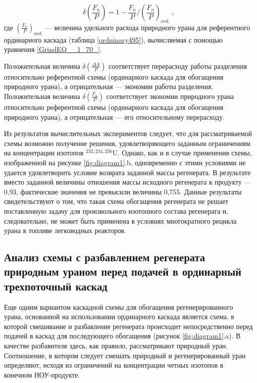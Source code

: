 \begin{equation} \label{DeltaFnu} 
  \delta(\frac{F_n}{P})=1-\frac{F_n}{P}/(\frac{F_n}{P})_{ord.} \; ,
\end{equation} 
где $(\frac{F_n}{P})_{ord.}$ --- величина удельного расхода природного урана для референтного ординарного каскада (таблица \ref{ordninary495}), вычисляемая с помощью уравнения \ref{GrindEQ__1_70_}.

Положительная величина $\delta(\frac{\Delta A}{P})$ соответствует перерасходу работы разделения относительно референтной схемы (ординарного каскада для обогащения природного урана), а отрицательная --- экономии работы разделения. Положительная величина $\delta(\frac{F_n}{P})$ соответствует экономии природного урана относительно референтной схемы (ординарного каскада для обогащения природного урана), а отрицательная --- его относительному перерасходу.


Из результатов вычислительных экспериментов следует, что для рассматриваемой схемы возможно получение решения, удовлетворяющего заданным ограничениям на концентрации изотопов $^{232,234,236}$U. Однако, как и в случае применения схемы, изображенной на рисунке \ref{fig:diagram1}.b, одновременно с этими условиями не удается удовлетворить условие возврата заданной массы регенерата. В результате вместо заданной величины отношения массы исходного регенерата к продукту --- 0,93, фактические значения не превысили величины 0,755. Данные результаты свидетельствуют о том, что такая схема обогащения регенерата не решает поставленную задачу для произвольного изотопного состава регенерата и, следовательно, не может быть применена в условиях многократного рецикла урана в топливе легководных реакторов.


\subsection{Анализ схемы с разбавлением регенерата природным ураном перед подачей в ординарный трехпоточный каскад}

Еще одним вариантом каскадной схемы для обогащения регенерированного урана, основанной на использовании ординарного каскада является схема, в которой смешивание и разбавление регенерата происходит непосредственно перед подачей в каскад для последующего обогащения (рисунок \ref{fig:diagram1}.a). В качестве разбавителя здесь, как правило, рассматривают природный уран. Соотношение, в котором следует смешать природный и регенерированный уран определяют, исходя из ограничений на концентрации четных изотопов в конечном НОУ-продукте.

